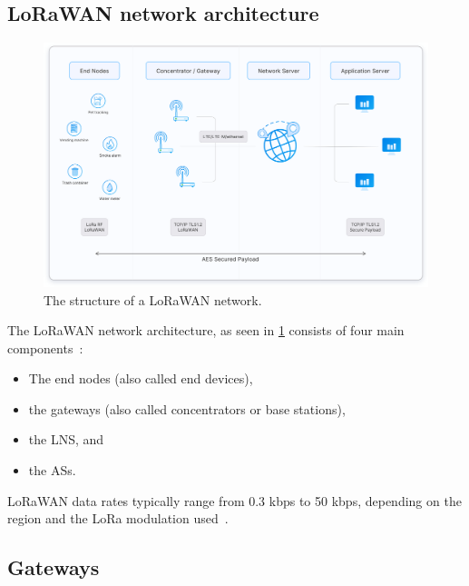 \subsection{\acs{LoRaWAN} network architecture}

\begin{figure}[htbp]
    \centering
    \includegraphics[width=1\textwidth]{pictures/lorawan-structure/lorawan-architecture.png}
    \caption{
        The structure of a \ac{LoRaWAN} network.~\protect\cite{the_things_industries_bv_lorawan_nodate}
    }\label{pic:lorawan-network-structure}
\end{figure}

The \ac{LoRaWAN} network architecture, as seen in \cref{pic:lorawan-network-structure} consists of four main components~\cite[p. 8]{lora_alliance_inc_lorawan_specification_2017}:

\begin{itemize}
    \item The end nodes (also called end devices),
    \item the gateways (also called concentrators or base stations),
    \item the \acf{LNS}, and
    \item the \acfp{AS}.
\end{itemize}

\ac{LoRaWAN} data rates typically range from 0.3 kbps to 50 kbps, depending on the region and the \ac{LoRa} modulation used~\cite[p. 8]{lora_alliance_inc_lorawan_specification_2017}.

\subsection{Gateways}\label{sec:gateways}


